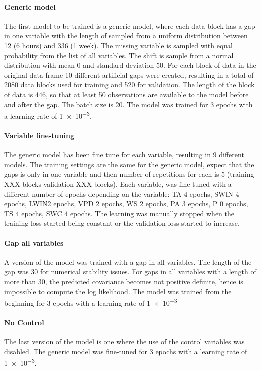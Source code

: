 \documentclass{article}
\begin{document}
\paragraph{Generic model} The first model to be trained is a generic model, where each data block has a gap in one variable with the length of sampled from a uniform distribution between \num{12} (6 hours) and \num{336} (1 week). The missing variable is sampled with equal probability from the list of all variables. The shift is sample from a normal distribution with mean 0 and standard deviation 50. For each block of data in the original data frame 10 different artificial gaps were created, resulting in a total of 2080 data blocks used for training and 520 for validation. 
The length of the block of data is \num{446}, so that at least \num{50} observations are available to the model before and after the gap. The batch size is \num{20}.
The model was trained for \num{3} epochs with a learning rate of \num{1e-3}.

\paragraph{Variable fine-tuning} The generic model has been fine tune for each variable, resulting in \num{9} different models. The training settings are the same for the generic model, expect that the gaps is only in one variable and then number of repetitions for each is 5 (training XXX blocks validation XXX blocks). Each variable, was fine tuned with a different number of epochs depending on the variable: TA \num{4} epochs, SW\textunderscore IN \num{4} epochs, LW\textunderscore IN\num{2} epochs, VPD \num{2} epochs, WS \num{2} epochs, PA \num{3} epochs, P \num{0} epochs, TS \num{4} epochs, SWC \num{4} epochs. The learning was manually stopped when the training loss started being constant or the validation loss started to increase.

\paragraph{Gap all variables} A version of the model was trained with a gap in all variables. The length of the gap was \num{30} for numerical stability issues. For gaps in all variables with a length of more than 30, the predicted covariance becomes not positive definite, hence is impossible to compute the log likelihood. The model was trained from the beginning for \num{3} epochs with a learning rate of \num{1e-3}

\paragraph{No Control} The last version of the model is one where the use of the control variables was disabled. The generic model was fine-tuned for \num{3} epochs with a learning rate of \num{1e-3}.
\end{document}
